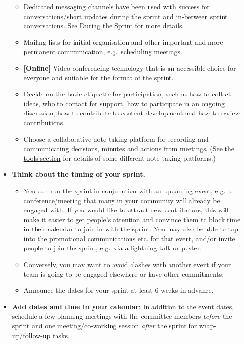 \documentclass[
]{book}
\providecommand{\tightlist}{%
  \setlength{\itemsep}{0pt}\setlength{\parskip}{0pt}}
\begin{document}
\begin{itemize}
  \begin{itemize}
  \tightlist
  \item
    Dedicated messaging channels have been used with success for conversations/short updates during the sprint and in-between sprint conversations.
    See \protect\hyperlink{during-the-sprint}{During the Sprint} for more details.
  \item
    Mailing lists for initial organisation and other important and more permanent communication, e.g.~scheduling meetings.
  \item
    \textbf{{[}Online{]}} Video conferencing technology that is an accessible choice for everyone and suitable for the format of the sprint.
  \item
    Decide on the basic etiquette for participation, such as how to collect ideas, who to contact for support, how to participate in an ongoing discussion, how to contribute to content development and how to review contributions.
  \item
    Choose a collaborative note-taking platform for recording and communicating decisions, minutes and actions from meetings. (See \protect\hyperlink{tools-and-resources}{the tools section} for details of some different note taking platforms.)
  \end{itemize}
\item
  \textbf{Think about the timing of your sprint.}

  \begin{itemize}
  \tightlist
  \item
    You can run the sprint in conjunction with an upcoming event, e.g.~a conference/meeting that many in your community will already be engaged with.
    If you would like to attract new contributors, this will make it easier to get people's attention and
    convince them to block time in their calendar to join in with the sprint.
    You may also be able to tap into the promotional communications etc. for that event,
    and/or invite people to join the sprint, e.g.~via a lightning talk or poster.
  \item
    Conversely, you may want to avoid clashes with another event if your team is going to be engaged elsewhere or have other commitments.
  \item
    Announce the dates for your sprint at least 6 weeks in advance.
  \end{itemize}
\item
  \textbf{Add dates and time in your calendar}: In addition to the event dates, schedule a few planning meetings with the committee members \emph{before} the sprint and one meeting/co-working session \emph{after} the sprint for wrap-up/follow-up tasks.


\end{itemize}
\end{document}
